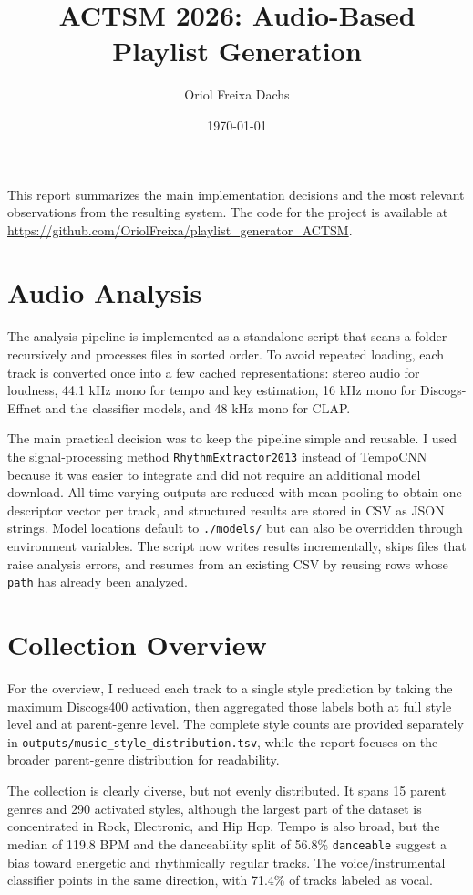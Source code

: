 \documentclass[11pt,a4paper]{article}
\title{ACTSM 2026: Audio-Based Playlist Generation}
\author{Oriol Freixa Dachs}
\date{\today}
\newcommand{\code}[1]{\texttt{#1}}
\begin{document}
\maketitle

This report summarizes the main implementation decisions and the most relevant observations from the resulting system. The code for the project is available at \url{https://github.com/OriolFreixa/playlist_generator_ACTSM}.

\section{Audio Analysis}

The analysis pipeline is implemented as a standalone script that scans a folder recursively and processes files in sorted order. To avoid repeated loading, each track is converted once into a few cached representations: stereo audio for loudness, 44.1 kHz mono for tempo and key estimation, 16 kHz mono for Discogs-Effnet and the classifier models, and 48 kHz mono for CLAP.

The main practical decision was to keep the pipeline simple and reusable. I used the signal-processing method \code{RhythmExtractor2013} instead of TempoCNN because it was easier to integrate and did not require an additional model download. All time-varying outputs are reduced with mean pooling to obtain one descriptor vector per track, and structured results are stored in CSV as JSON strings. Model locations default to \code{./models/} but can also be overridden through environment variables. The script now writes results incrementally, skips files that raise analysis errors, and resumes from an existing CSV by reusing rows whose \code{path} has already been analyzed.

\section{Collection Overview}

For the overview, I reduced each track to a single style prediction by taking the maximum Discogs400 activation, then aggregated those labels both at full style level and at parent-genre level. The complete style counts are provided separately in \code{outputs/music\_style\_distribution.tsv}, while the report focuses on the broader parent-genre distribution for readability.

The collection is clearly diverse, but not evenly distributed. It spans 15 parent genres and 290 activated styles, although the largest part of the dataset is concentrated in Rock, Electronic, and Hip Hop. Tempo is also broad, but the median of 119.8 BPM and the danceability split of 56.8\% \code{danceable} suggest a bias toward energetic and rhythmically regular tracks. The voice/instrumental classifier points in the same direction, with 71.4\% of tracks labeled as vocal.
\end{document}
